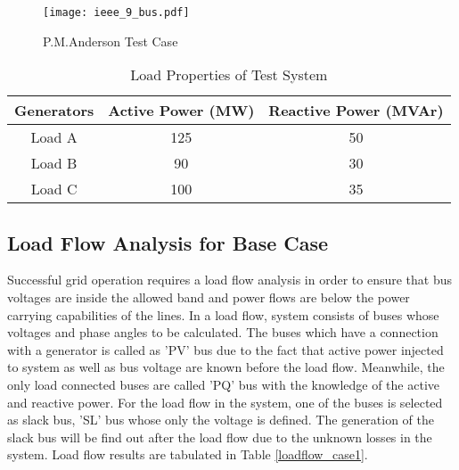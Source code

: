 \begin{figure}[h]
	\centering
	\texttt{[image: ieee\_9\_bus.pdf]}
	\caption{P.M.Anderson Test Case}
	\label{ieee_9_bus}
\end{figure}
\begin{table}[h!]
	\centering
	\begin{tabular}{ccc}
		\hline
		\textbf{Generators} & \textbf{Active Power (MW)}  & \textbf{Reactive Power (MVAr)} \\ \hline
		Load A              & 125                      	  & 50				 \\
		Load B              & 90                          & 30                \\
		Load C              & 100                         & 35                \\ \hline
	\end{tabular}
	\caption{Load Properties of Test System}
	\label{loadproperties}
\end{table}
\subsection{Load Flow Analysis for Base Case}
Successful grid operation requires a load flow analysis in order to ensure that bus voltages are inside the allowed band and power flows are below the power carrying capabilities of the lines. In a load flow, system consists of buses whose voltages and phase angles to be calculated. The buses which have a connection with a generator is called as 'PV' bus due to the fact that active power injected to system as well as bus voltage are known before the load flow. Meanwhile, the only load connected buses are called 'PQ' bus with the knowledge of the active and reactive power. For the load flow in the system, one of the buses is selected as slack bus, 'SL' bus whose only the voltage is defined. The generation of the slack bus will be find out after the load flow due to the unknown losses in the system. Load flow results are tabulated in Table \ref{loadflow_case1}.

